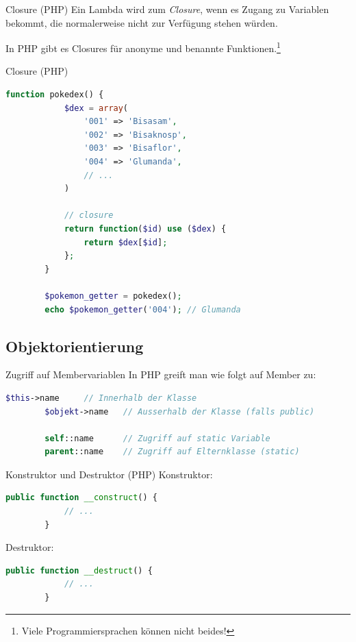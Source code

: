 \begin{defi}{Closure (PHP)}
    Ein Lambda wird zum \emph{Closure}, wenn es Zugang zu Variablen bekommt, die normalerweise nicht zur Verfügung stehen würden.

    In PHP gibt es Closures für anonyme und benannte Funktionen.\footnote{Viele Programmiersprachen können nicht beides!}
\end{defi}

\begin{example}{Closure (PHP)}
    \begin{lstlisting}[language=php]
        function pokedex() {
            $dex = array(
                '001' => 'Bisasam',
                '002' => 'Bisaknosp',
                '003' => 'Bisaflor',
                '004' => 'Glumanda',
                // ... 
            )

            // closure 
            return function($id) use ($dex) {
                return $dex[$id];
            };
        }

        $pokemon_getter = pokedex();
        echo $pokemon_getter('004'); // Glumanda
    \end{lstlisting}
\end{example}

\subsection{Objektorientierung}

\begin{bonus}{Zugriff auf Membervariablen}
    In PHP greift man wie folgt auf Member zu:

    \begin{lstlisting}[language=php]
        $this->name     // Innerhalb der Klasse
        $objekt->name   // Ausserhalb der Klasse (falls public)

        self::name      // Zugriff auf static Variable 
        parent::name    // Zugriff auf Elternklasse (static)
    \end{lstlisting}
\end{bonus}

\begin{bonus}{Konstruktor und Destruktor (PHP)}
    Konstruktor:

    \begin{lstlisting}[language=php]
        public function __construct() {
            // ...
        }
    \end{lstlisting}

    Destruktor:

    \begin{lstlisting}[language=php]
        public function __destruct() {
            // ...
        }
    \end{lstlisting}
\end{bonus}


